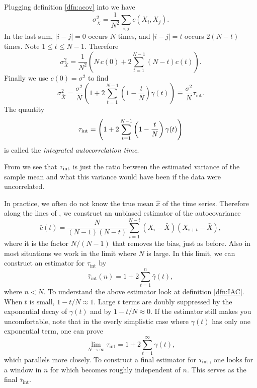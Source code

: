 Plugging definition \eqref{dfn:acov} into  we have 
\begin{equation}
  \sigma^2_{\bar{X}}=\frac{1}{N^2}\sum_{i,j}c(X_i,X_j).
\end{equation}
In the last sum, $|i-j|=0$ occurs $N$ times, and $|i-j|=t$ occurs
$2(N-t)$ times. Note $1\leq t\leq N-1$. Therefore
\begin{equation}
  \sigma^2_{\bar{X}}=\frac{1}{N^2}
    \left(N\,c(0)+2\sum_{t=1}^{N-1}(N-t)c(t)\right).
\end{equation}
Finally we use $c(0)=\sigma^2$ to find
\begin{equation}\label{eq:IAC}
  \sigma^2_{\bar{X}}
    =\frac{\sigma^2}{N}\left(1+2\sum_{t=1}^{N-1}\left(1-\frac{t}{N}\right)
     \gamma(t)\right)
    \equiv\frac{\sigma^2}{N}\tau_\text{int}.
\end{equation}
The quantity
\begin{equation}\label{dfn:IAC}\index{autocorrelation time!integrated}
  \tauint=\left(1+2\sum_{t=1}^{N-1}\left(1-\frac{t}{N}\right)
   \gamma(t)\right)
\end{equation}
is called the {\it integrated autocorrelation time}.

From  we see that $\tau_\text{int}$ is just the ratio between the
estimated variance of the sample mean and what this variance would have been 
if the data were uncorrelated. 

In practice, we often do not know the true mean $\hat{x}$ of the time series.
Therefore along the lines of , we construct an unbiased
estimator of the autocovariance
\begin{equation}
  \bar{c}(t)=\frac{N}{(N-1)(N-t)}
    \sum_{i=1}^{N-t}(X_i-\bar{X})(X_{i+t}-\bar{X}),
\end{equation}
where it is the factor $N/(N-1)$ that removes the bias, just as before.
Also in most situations we work in the limit where $N$ is large. In this
limit, we can construct an estimator for $\tau_\text{int}$ by
\begin{equation}\label{eq:IACest}
  \bar{\tau}_\text{int}(n)=1+2\sum_{t=1}^n\bar{\gamma}(t),
\end{equation}
where $n<N$. To understand the above estimator look at definition
\eqref{dfn:IAC}. When $t$ is small, $1-t/N\approx 1$. Large $t$ terms
are doubly suppressed by the exponential decay of $\gamma(t)$ and
by $1-t/N\approx 0$. If the estimator still makes you uncomfortable,
note that in the overly simplistic case where
$\gamma(t)$ has only one exponential term, one can prove
\begin{equation}
  \lim_{N\to\infty}\tau_\text{int}=1+2\sum_{t=1}^\infty\gamma(t),
\end{equation}
which parallels  more closely. To construct a final
estimator for $\tau_\text{int}$, one looks for a window in $n$ for which
 becomes roughly independent of $n$. This serves
as the final $\bar{\tau}_\text{int}$.

